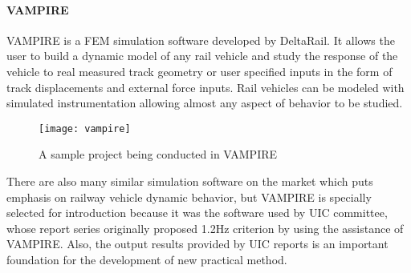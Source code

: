 \paragraph{VAMPIRE}

VAMPIRE is a FEM simulation software developed by DeltaRail. It allows the user to build a dynamic model of any rail vehicle and study the response of the vehicle to real measured track geometry or user specified inputs in the form of track displacements and external force inputs. Rail vehicles can be modeled with simulated instrumentation allowing almost any aspect of behavior to be studied. 

\begin{figure}[h!]
    \centering
    \texttt{[image: vampire]}
    \caption{A sample project being conducted in VAMPIRE}
    \label{fig:vampire}
\end{figure}

There are also many similar simulation software on the market which puts emphasis on railway vehicle dynamic behavior, but VAMPIRE is specially selected for introduction because it was the software used by UIC committee, whose report series originally proposed 1.2Hz criterion by using the assistance of VAMPIRE. Also, the output results provided by UIC reports is an important foundation for the development of new practical method.